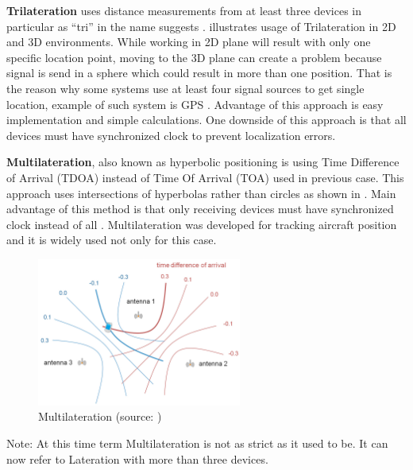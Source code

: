 \textbf{Trilateration} uses distance measurements from at least three devices in particular as \enquote{tri} in the name suggests \cite{RAinWILTaS}.  illustrates usage of Trilateration in 2D and 3D environments. While working in 2D plane will result with only one specific location point, moving to the 3D plane can create a problem because signal is send in a sphere which could result in more than one position. That is the reason why some systems use at least four signal sources to get single location, example of such system is GPS \cite{GNSSGPS}. Advantage of this approach is easy implementation and simple calculations. One downside of this approach is that all devices must have synchronized clock \cite{RAinWILTaS} to prevent localization errors.

\medskip

\textbf{Multilateration}, also known as hyperbolic positioning is using Time Difference of Arrival (TDOA) instead of Time Of Arrival (TOA) used in previous case. This approach uses intersections of hyperbolas rather than circles as shown in . Main advantage of this method is that only receiving devices must have synchronized clock instead of all \cite{PLTaA}. Multilateration was developed for tracking aircraft position and it is widely used not only for this case.

\begin{figure}[h!]
	\begin{centering}
		\includegraphics[width=0.6\textwidth]{img/multilateration}
		\par\end{centering}
	\caption{Multilateration (source: \cite{HPwAA})\label{fig:Multilateration}}
	\label{fig02c02}
\end{figure}

Note: At this time term Multilateration is not as strict as it used to be. It can now refer to Lateration with more than three devices.

